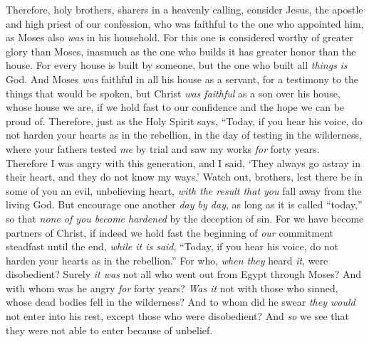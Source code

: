\begin{biblechapter} %
 Therefore, holy brothers, sharers in a heavenly calling, consider Jesus, the apostle and high priest of our confession,
\verse who was faithful to the one who appointed him, as Moses also \textit{was} in his household.
\verse For this one is considered worthy of greater glory than Moses, inasmuch as the one who builds it has greater honor than the house.
\verse For every house is built by someone, but the one who built all \textit{things} \textit{is} God.
\verse And Moses \textit{was} faithful in all his house as a servant, for a testimony to the things that would be spoken,
\verse but Christ \textit{was faithful} as a son over his house, whose house we are, if we hold fast to our confidence and the hope we can be proud of.
 Therefore, just as the Holy Spirit says,
\verse “Today, if you hear his voice,
\verse do not harden your hearts as in the rebellion, 
in the day of testing in the wilderness,
\verse where your fathers tested \textit{me} by trial 
and saw my works
\verse \textit{for} forty years. 
Therefore I was angry with this generation, 
and I said, ‘They always go astray in their heart, 
and they do not know my ways.’
\verse Watch out, brothers, lest there be in some of you an evil, unbelieving heart, \textit{with the result that you} fall away from the living God.
\verse But encourage one another \textit{day by day}, as long as it is called “today,” so that \textit{none of you become hardened} by the deception of sin.
\verse For we have become partners of Christ, if indeed we hold fast the beginning of \textit{our} commitment steadfast until the end,
\verse \textit{while it is said}, “Today, if you hear his voice, 
do not harden your hearts as in the rebellion.”
\verse For who, \textit{when they} heard \textit{it}, were disobedient? Surely \textit{it was} not all who went out from Egypt through Moses?
\verse And with whom was he angry \textit{for} forty years? \textit{Was it} not with those who sinned, whose dead bodies fell in the wilderness?
\verse And to whom did he swear \textit{they would} not enter into his rest, except those who were disobedient?
\verse And \textit{so} we see that they were not able to enter because of unbelief.
\end{biblechapter}

